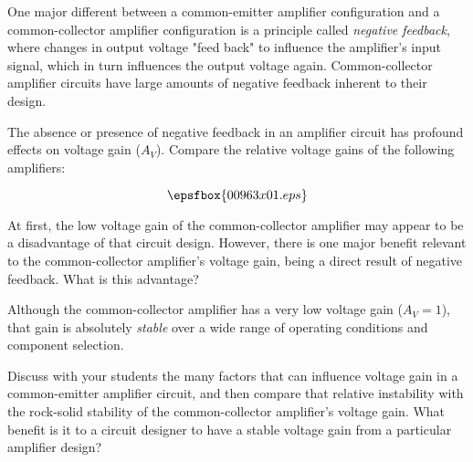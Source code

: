 

One major different between a common-emitter amplifier configuration and a common-collector amplifier configuration is a principle called {\it negative feedback}, where changes in output voltage "feed back" to influence the amplifier's input signal, which in turn influences the output voltage again.  Common-collector amplifier circuits have large amounts of negative feedback inherent to their design.

The absence or presence of negative feedback in an amplifier circuit has profound effects on voltage gain ($A_V$).  Compare the relative voltage gains of the following amplifiers:

$$\epsfbox{00963x01.eps}$$

At first, the low voltage gain of the common-collector amplifier may appear to be a disadvantage of that circuit design.  However, there is one major benefit relevant to the common-collector amplifier's voltage gain, being a direct result of negative feedback.  What is this advantage?







Although the common-collector amplifier has a very low voltage gain ($A_V = 1$), that gain is absolutely {\it stable} over a wide range of operating conditions and component selection.







Discuss with your students the many factors that can influence voltage gain in a common-emitter amplifier circuit, and then compare that relative instability with the rock-solid stability of the common-collector amplifier's voltage gain.  What benefit is it to a circuit designer to have a stable voltage gain from a particular amplifier design?




